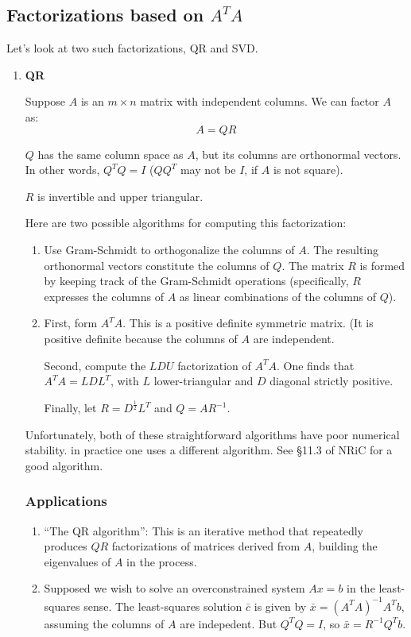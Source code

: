 \subsection{Factorizations based on $A^TA$}

Let's look at two such factorizations, QR and SVD.

\begin{enumerate}[label=(\roman*)]
    \item \textbf{QR}
        
    Suppose $A$ is an $m \times n$ matrix with independent columns. We can factor $A$ as:
    \[
        A = QR \tag*{($Q$ is $m \times n$,  $R$ is $n \times n$)}
    \]
    
    $Q$ has the same column space as $A$, but its columns are orthonormal vectors. In other words, $Q^TQ = I$ ($QQ^T$ may not be $I$, if $A$ is not square). 
    
    $R$ is invertible and upper triangular. 
    
    Here are two possible algorithms for computing this factorization:
    \begin{enumerate}
        \item Use Gram-Schmidt to orthogonalize the columns of $A$. The resulting orthonormal vectors constitute the columns of $Q$. The matrix $R$ is formed by keeping track of the Gram-Schmidt operations (specifically, $R$ expresses the columns of $A$ as linear combinations of the columns of $Q$). 
        \item First, form $A^TA$. This is a positive definite symmetric matrix. (It is positive definite because the columns of $A$ are independent. 
        
        Second, compute the $LDU$ factorization of $A^TA$. One finds that $A^TA = LDL^T$, with $L$ lower-triangular and $D$ diagonal strictly positive. 
        
        Finally, let $R = D^{\frac{1}{2}}L^T$ and $Q=AR^{-1}$. 
    \end{enumerate}
    
    Unfortunately, both of these straightforward algorithms have poor numerical stability. in practice one uses a different algorithm. See \S 11.3 of NRiC for a good algorithm.
    
    \subsubsection*{Applications}
    
    \begin{enumerate}[label=(\alph*)]
        \item ``The QR algorithm'': This is an iterative method that repeatedly produces $QR$ factorizations of matrices derived from $A$, building the eigenvalues of $A$ in the process.
        \item Supposed we wish to solve an overconstrained system $Ax = b$ in the least-squares sense. The least-squares solution $\bar{c}$ is given by $\bar{x}=(A^TA)^{-1}A^Tb$, assuming the columns of $A$ are indepedent. But $Q^TQ = I$, so $\bar{x} = R^{-1}Q^Tb$. 
        

\end{enumerate}
\end{enumerate}
